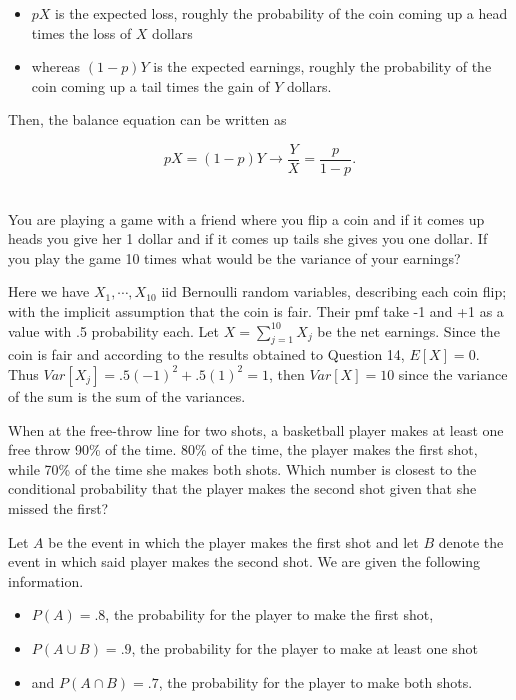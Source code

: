 \documentclass{homework}
\begin{document}
\begin{itemize}
    \item $pX$ is the expected loss, roughly the probability of the coin coming up a head times the loss of $X$ dollars
    \item whereas $(1-p)Y$ is the expected earnings, roughly the probability of the coin coming up a tail times the gain of $Y$ dollars.
\end{itemize}

Then, the balance equation can be written as

$$
pX = (1-p)Y \longrightarrow \frac{Y}{X} = \frac{p}{1-p}.
$$\\

\begin{tcolorbox}[title=Question 14]
You are playing a game with a friend where you flip a coin and if it comes up heads you give her 1 dollar and if it comes up tails she gives you one dollar.  If you play the game 10 times what would be the variance of your earnings?
\end{tcolorbox}

Here we have $X_{1},\cdots,X_{10}$ iid Bernoulli random variables, describing each coin flip; with the implicit assumption that the coin is fair. Their pmf take -1 and +1 as a value with .5 probability each. Let $X = \sum_{j=1}^{10} X_j$ be the net earnings. Since the coin is fair and according to the results obtained to Question 14, $E[X] =0$. Thus $Var[X_j] = .5(-1)^2+.5(1)^2=1$, then $Var[X]=10$ since the variance of the sum is the sum of the variances. \\

\begin{tcolorbox}[title=Question 15]
When at the free-throw line for two shots, a basketball player makes at least one free throw 90\% of the time. 80\% of the time, the player makes the first shot, while 70\% of the time she makes both shots. Which number is closest to the conditional probability that the player makes the second shot given that she missed the first?
\end{tcolorbox}

Let $A$ be the event in which the player makes the first shot and let $B$ denote the event in which said player makes the second shot. We are given the following information.

\begin{itemize}
    \item $P(A) = .8$, the probability for the player to make the first shot,
    \item $P(A \cup B) = .9$, the probability for the player to make at least one shot
    \item and $P(A \cap B) = .7$, the probability for the player to make both shots.
\end{itemize}
\end{document}
